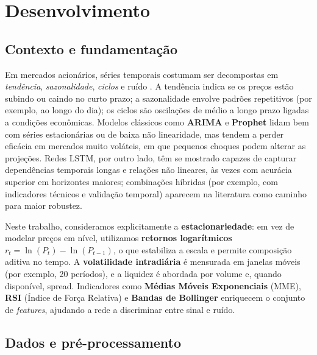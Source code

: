 \section{Desenvolvimento}
\label{sec:desenvolvimento}

\subsection{Contexto e fundamentação}

Em mercados acionários, séries temporais costumam ser decompostas em \emph{tendência}, \emph{sazonalidade}, \emph{ciclos} e ruído \cite{hyndman2018,box2015}. A tendência indica se os preços estão subindo ou caindo no curto prazo; a sazonalidade envolve padrões repetitivos (por exemplo, ao longo do dia); os ciclos são oscilações de médio a longo prazo ligadas a condições econômicas. Modelos clássicos como \textbf{ARIMA} e \textbf{Prophet} lidam bem com séries estacionárias ou de baixa não linearidade, mas tendem a perder eficácia em mercados muito voláteis, em que pequenos choques podem alterar as projeções. Redes LSTM, por outro lado, têm se mostrado capazes de capturar dependências temporais longas e relações não lineares, às vezes com acurácia superior em horizontes maiores; combinações híbridas (por exemplo, com indicadores técnicos e validação temporal) aparecem na literatura como caminho para maior robustez.

Neste trabalho, consideramos explicitamente a \textbf{estacionariedade}: em vez de modelar preços em nível, utilizamos \textbf{retornos logarítmicos} $r_t = \ln(P_t) - \ln(P_{t-1})$, o que estabiliza a escala e permite composição aditiva no tempo. A \textbf{volatilidade intradiária} é mensurada em janelas móveis (por exemplo, 20 períodos), e a liquidez é abordada por volume e, quando disponível, spread. Indicadores como \textbf{Médias Móveis Exponenciais} (MME), \textbf{RSI} (Índice de Força Relativa) e \textbf{Bandas de Bollinger} enriquecem o conjunto de \emph{features}, ajudando a rede a discriminar entre sinal e ruído.

\subsection{Dados e pré-processamento}

